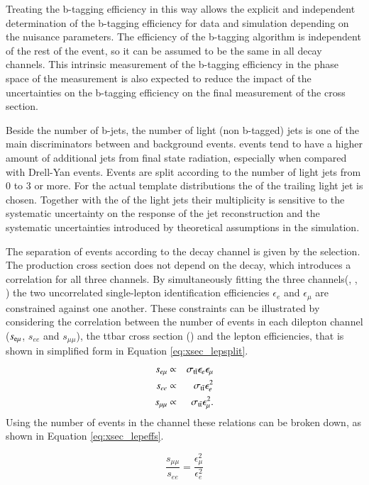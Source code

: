 Treating the b-tagging efficiency in this way allows the explicit and independent determination of the b-tagging efficiency for data and simulation depending on the nuisance parameters. The efficiency of the b-tagging algorithm is independent of the rest of the event, so it can be assumed to be the same in all \ttbar decay channels.
This intrinsic measurement of the b-tagging efficiency in the phase space of the measurement is also expected to reduce the impact of the uncertainties on the b-tagging efficiency on the final measurement of the \ttbar cross section.

Beside the number of b-jets, the number of light (non b-tagged) jets is one of the main discriminators between \ttbar and background events.
\ttbar events tend to have a higher amount of additional jets from final state radiation, especially when compared with Drell-Yan events.
Events are split according to the number of light jets from 0 to 3 or more.
For the actual template distributions the \pt of the trailing light jet is chosen.
Together with the \pt of the light jets their multiplicity is sensitive to the systematic uncertainty on the response of the jet reconstruction and
the systematic uncertainties introduced by theoretical assumptions in the simulation.

The separation of events according to the decay channel is given by the selection. The \ttbar production cross section does not depend on the decay, which introduces a correlation for all three channels.
By simultaneously fitting the three channels(\emu, \ee, \mumu) the two uncorrelated single-lepton identification efficiencies $\epsilon_e$ and $\epsilon_\mu$ are constrained against one another. 
These constraints can be illustrated by considering the correlation between the number of events in each dilepton channel ($s_{\mathrm{e}\mu}$, $s_{ee}$ and $s_{\mu\mu}$), the ttbar cross section (\stt) and the lepton 
efficiencies, that is shown in simplified form in Equation \ref{eq:xsec_lepsplit}.
\begin{eqnarray}
s_{e \mu}  &\propto& \sigma_\mathrm{t\bar{t}} \epsilon_{e} \epsilon_{\mu}  \\
s_{ee}  &\propto&  \sigma_\mathrm{t\bar{t}} \epsilon_{e}^2  \\
s_{\mu \mu}  &\propto&  \sigma_\mathrm{t\bar{t}} \epsilon_{\mu}^2
\label{eq:xsec_lepsplit}.
\end{eqnarray}
Using the number of events in the \emu channel these relations can be broken down, as shown in Equation \ref{eq:xsec_lepeffs}.

\begin{equation}
\frac{s_{\mu\mu}}{s_{ee}} = \frac{\epsilon_{\mu}^2}{\epsilon_{e}^2}
\label{eq:xsec_lepeffs}
\end{equation}

